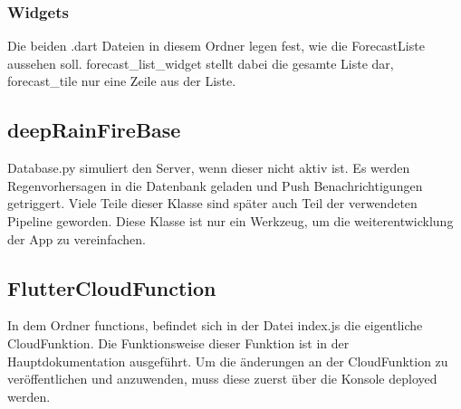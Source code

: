 \subsubsection*{Widgets}
Die beiden .dart Dateien in diesem Ordner legen fest, wie die ForecastListe aussehen soll. forecast\_list\_widget stellt 
dabei die gesamte Liste dar, forecast\_tile nur eine Zeile aus der Liste. 

\subsection{deepRainFireBase}
Database.py simuliert den Server, wenn dieser nicht aktiv ist. 
Es werden Regenvorhersagen in die Datenbank geladen und Push Benachrichtigungen getriggert.
Viele Teile dieser Klasse sind später auch Teil der verwendeten Pipeline geworden. 
Diese Klasse ist nur ein Werkzeug, um die weiterentwicklung der App zu vereinfachen. 

\subsection{FlutterCloudFunction}
In dem Ordner functions, befindet sich in der Datei index.js die eigentliche CloudFunktion.
Die Funktionsweise dieser Funktion ist in der Hauptdokumentation ausgeführt. 
Um die änderungen an der CloudFunktion zu veröffentlichen und anzuwenden, muss diese zuerst über die Konsole 
deployed werden. 